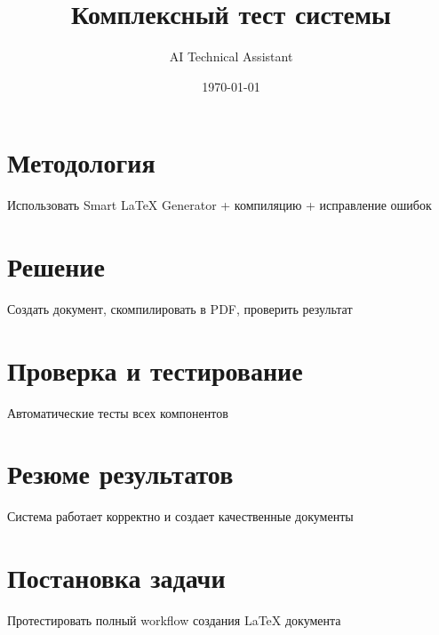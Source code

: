 \documentclass[12pt,a4paper]{article}
\title{Комплексный тест системы}
\author{AI Technical Assistant}
\date{\today}
\begin{document}
\maketitle
\tableofcontents
\newpage

\section{Методология}
Использовать Smart LaTeX Generator + компиляцию + исправление ошибок

\section{Решение}
Создать документ, скомпилировать в PDF, проверить результат

\section{Проверка и тестирование}
Автоматические тесты всех компонентов

\section{Резюме результатов}
Система работает корректно и создает качественные документы

\section{Постановка задачи}
Протестировать полный workflow создания LaTeX документа
\end{document}
